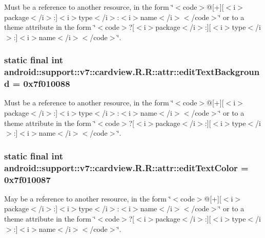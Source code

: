 Must be a reference to another resource, in the form \char`\"{}$<$code$>$@\mbox{[}+\mbox{]}\mbox{[}$<$i$>$package$<$/i$>$:\mbox{]}$<$i$>$type$<$/i$>$:$<$i$>$name$<$/i$>$$<$/code$>$\char`\"{} or to a theme attribute in the form \char`\"{}$<$code$>$?\mbox{[}$<$i$>$package$<$/i$>$:\mbox{]}\mbox{[}$<$i$>$type$<$/i$>$:\mbox{]}$<$i$>$name$<$/i$>$$<$/code$>$\char`\"{}. \hypertarget{classandroid_1_1support_1_1v7_1_1cardview_1_1_r_1_1attr_c37bad1ac10fbad2f4735ac733ec4742}{
\subsubsection[{editTextBackground}]{\setlength{\rightskip}{0pt plus 5cm}static final int android::support::v7::cardview.R.R::attr::editTextBackground = 0x7f010088}}
\label{classandroid_1_1support_1_1v7_1_1cardview_1_1_r_1_1attr_c37bad1ac10fbad2f4735ac733ec4742}


Must be a reference to another resource, in the form \char`\"{}$<$code$>$@\mbox{[}+\mbox{]}\mbox{[}$<$i$>$package$<$/i$>$:\mbox{]}$<$i$>$type$<$/i$>$:$<$i$>$name$<$/i$>$$<$/code$>$\char`\"{} or to a theme attribute in the form \char`\"{}$<$code$>$?\mbox{[}$<$i$>$package$<$/i$>$:\mbox{]}\mbox{[}$<$i$>$type$<$/i$>$:\mbox{]}$<$i$>$name$<$/i$>$$<$/code$>$\char`\"{}. \hypertarget{classandroid_1_1support_1_1v7_1_1cardview_1_1_r_1_1attr_deced4732391bf240a1d032c1d1dde42}{
\subsubsection[{editTextColor}]{\setlength{\rightskip}{0pt plus 5cm}static final int android::support::v7::cardview.R.R::attr::editTextColor = 0x7f010087}}
\label{classandroid_1_1support_1_1v7_1_1cardview_1_1_r_1_1attr_deced4732391bf240a1d032c1d1dde42}


May be a reference to another resource, in the form \char`\"{}$<$code$>$@\mbox{[}+\mbox{]}\mbox{[}$<$i$>$package$<$/i$>$:\mbox{]}$<$i$>$type$<$/i$>$:$<$i$>$name$<$/i$>$$<$/code$>$\char`\"{} or to a theme attribute in the form \char`\"{}$<$code$>$?\mbox{[}$<$i$>$package$<$/i$>$:\mbox{]}\mbox{[}$<$i$>$type$<$/i$>$:\mbox{]}$<$i$>$name$<$/i$>$$<$/code$>$\char`\"{}. 


